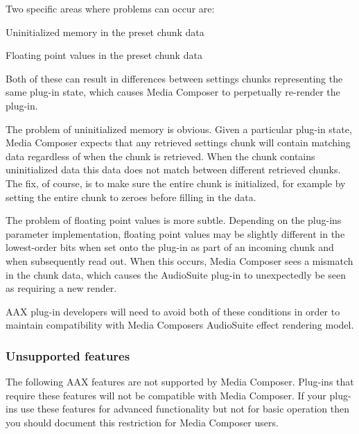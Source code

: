 Two specific areas where problems can occur are\+:


\begin{DoxyItemize}
\item Uninitialized memory in the preset chunk data
\item Floating point values in the preset chunk data
\end{DoxyItemize}

Both of these can result in differences between settings chunks representing the same plug-\/in state, which causes Media Composer to perpetually re-\/render the plug-\/in.

The problem of uninitialized memory is obvious. Given a particular plug-\/in state, Media Composer expects that any retrieved settings chunk will contain matching data regardless of when the chunk is retrieved. When the chunk contains uninitialized data this data does not match between different retrieved chunks. The fix, of course, is to make sure the entire chunk is initialized, for example by setting the entire chunk to zeroes before filling in the data.

The problem of floating point values is more subtle. Depending on the plug-\/in\textquotesingle{}s parameter implementation, floating point values may be slightly different in the lowest-\/order bits when set onto the plug-\/in as part of an incoming chunk and when subsequently read out. When this occurs, Media Composer sees a mismatch in the chunk data, which causes the Audio\+Suite plug-\/in to unexpectedly be seen as requiring a new render.

A\+A\+X plug-\/in developers will need to avoid both of these conditions in order to maintain compatibility with Media Composer\textquotesingle{}s Audio\+Suite effect rendering model.

\hypertarget{a00361_subsection__aax_media_composer_guide__features__unsupported}{}\subsubsection{Unsupported features}\label{a00361_subsection__aax_media_composer_guide__features__unsupported}
 The following A\+A\+X features are not supported by Media Composer. Plug-\/ins that require these features will not be compatible with Media Composer. If your plug-\/ins use these features for advanced functionality but not for basic operation then you should document this restriction for Media Composer users.



